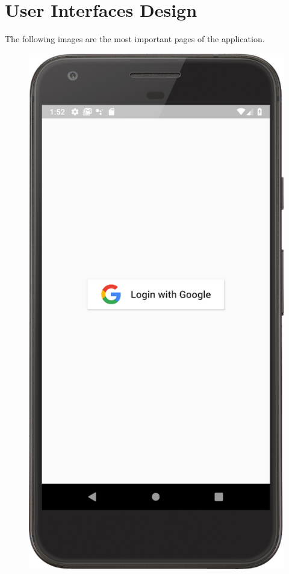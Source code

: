 \section{User Interfaces Design}
The following images are the most important pages of the application.\\
\begin{figure}[!htb]
    \begin{minipage}[b]{0.3\textwidth}
        \includegraphics[scale=1]{images/login-page.png}

\end{minipage}
\end{figure}
